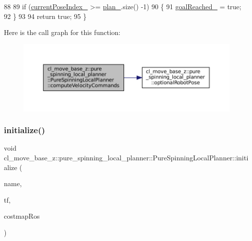 \begin{DoxyCode}
88 
89   \textcolor{keywordflow}{if} (\hyperlink{classcl__move__base__z_1_1pure__spinning__local__planner_1_1PureSpinningLocalPlanner_aa0f9b4cf52a76e44dc2cfc5103d52dcd}{currentPoseIndex\_} >= \hyperlink{classcl__move__base__z_1_1pure__spinning__local__planner_1_1PureSpinningLocalPlanner_a31875ee78bae4698b579e20c0754860d}{plan\_}.size() -1)
90   \{
91     \hyperlink{classcl__move__base__z_1_1pure__spinning__local__planner_1_1PureSpinningLocalPlanner_aecfe0dfc68b8c8e461e8b684e5fa4d2f}{goalReached\_} = \textcolor{keyword}{true};
92   \}
93 
94   \textcolor{keywordflow}{return} \textcolor{keyword}{true};
95 \}
\end{DoxyCode}
Here is the call graph for this function\+:
\nopagebreak
\begin{figure}[H]
\begin{center}
\leavevmode
\includegraphics[width=350pt]{classcl__move__base__z_1_1pure__spinning__local__planner_1_1PureSpinningLocalPlanner_af7dfee89a0a6c54569b5fd262ccbd4f0_cgraph}
\end{center}
\end{figure}
\mbox{\label{classcl__move__base__z_1_1pure__spinning__local__planner_1_1PureSpinningLocalPlanner_afc2d05b55e4a68932bbf8b4aabe9e219}} 
\subsubsection{\texorpdfstring{initialize()}{initialize()}\hspace{0.1cm}{\footnotesize\ttfamily [1/3]}}
{\footnotesize\ttfamily void cl\+\_\+move\+\_\+base\+\_\+z\+::pure\+\_\+spinning\+\_\+local\+\_\+planner\+::\+Pure\+Spinning\+Local\+Planner\+::initialize (\begin{DoxyParamCaption}\item[{std\+::string}]{name,  }\item[{tf\+::\+Transform\+Listener $\ast$}]{tf,  }\item[{costmap\+\_\+2d\+::\+Costmap2\+D\+R\+OS $\ast$}]{costmap\+Ros }\end{DoxyParamCaption})}



